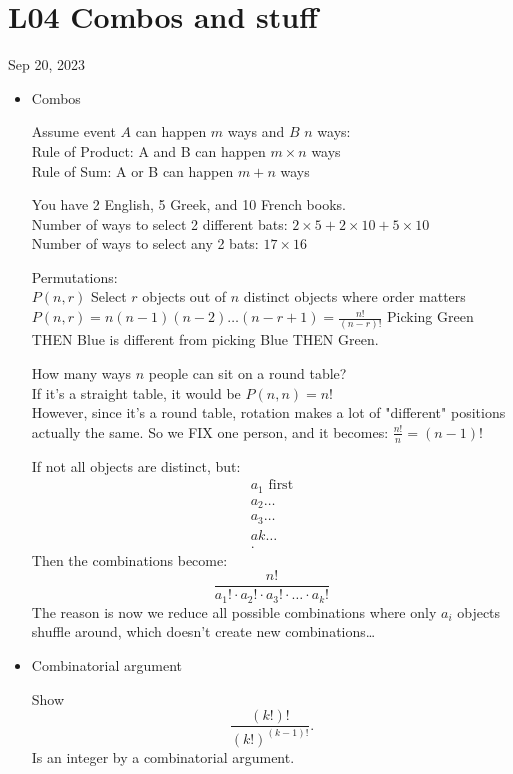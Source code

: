 \section{L04 Combos and stuff}
Sep 20, 2023
\begin{itemize}
	\item Combos
		\begin{theorem}
			Assume event $A$ can happen $m$ ways and $B$ $n$ ways:\\
			Rule of Product: A and B can happen $m\times n$ ways\\
			Rule of Sum: A or B can happen $m + n$ ways
		\end{theorem}
		\begin{example}
			You have 2 English, 5 Greek, and 10 French books.\\
			Number of ways to select 2 different bats: $2\times 5 + 2\times 10 + 5\times 10$ \\
			Number of ways to select any 2 bats: $17\times 16$
		\end{example}
		\begin{theorem}
			Permutations:\\
			$P(n,r)$ Select $r$ objects out of $n$ distinct objects where order matters\\
			$P(n,r) = n \left( n-1 \right) \left( n-2 \right) \ldots \left( n-r+1 \right) = \frac{n!}{\left( n-r \right) !}$
			Picking Green THEN Blue is different from picking Blue THEN Green.
		\end{theorem}
		\begin{example}
			How many ways $n$ people can sit on a round table?\\
			If it's a straight table, it would be $P\left( n,n \right) = n!$ \\
			However, since it's a round table, rotation makes a lot of "different" positions actually the same. So we FIX one person, and it becomes:
			$\frac{n!}{n} = \left( n-1 \right) !$
		\end{example}
		\begin{theorem}
			If not all objects are distinct, but:\\
			\begin{align*}
				a_1 \text{ first}\\
				a_2\ldots\\
				a_3\ldots\\
				ak\ldots\\
			.\end{align*}
			Then the combinations become:
			\begin{equation}
				\frac{n!}{a_1! \cdot a_2! \cdot a_3! \cdot \ldots \cdot  a_{k}!}
			\end{equation}
			The reason is now we reduce all possible combinations where only $a_i$ objects shuffle around, which doesn't create new combinations\ldots
		\end{theorem}
	\item Combinatorial argument
		\begin{example}
			Show \[
			\frac{\left( k! \right) !}{\left( k! \right) ^{\left( k-1 \right) !}}
			.\] 
			Is an integer by a combinatorial argument.\\


\end{example}
\end{itemize}
